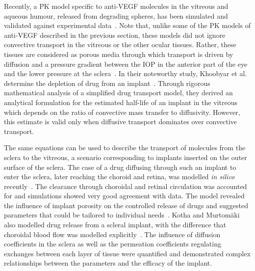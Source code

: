 \documentclass{article}
\begin{document}
Recently, a PK model specific to anti-VEGF molecules in the vitreous and aqueous humour, released from degrading spheres, has been simulated and validated against experimental data~\cite{Heljak_2022}.
Note that, unlike some of the PK models of anti-VEGF described in the previous section, these models did not ignore convective transport in the vitreous or the other ocular tissues.
Rather, these tissues are considered as porous media through which transport is driven by diffusion and a pressure gradient between the IOP in the anterior part of the eye and the lower pressure at the sclera~\cite{Ferreira_2020,Ferreira_2018,Heljak_2022,Khoobyar_2021,Li_2022a}.
In their noteworthy study, Khoobyar et al. determine the depletion of drug from an implant~\cite{Khoobyar_2022}.
Through rigorous mathematical analysis of a simplified drug transport model, they derived an analytical formulation for the estimated half-life of an implant in the vitreous which depends on the ratio of convective mass transfer to diffusivity.
However, this estimate is valid only when diffusive transport dominates over convective transport.



The same equations can be used to describe the transport of molecules from the sclera to the vitreous, a scenario corresponding to implants inserted on the outer surface of the sclera.
The case of a drug diffusing through such an implant to enter the sclera, later reaching the choroid and retina, was modelled \textit{in silico} recently~\cite{Abootorabi_2021}.
The clearance through choroidal and retinal circulation was accounted for and simulations showed very good agreement with data.
The model revealed the influence of implant porosity on the controlled release of drugs and suggested parameters that could be tailored to individual needs~\cite{Abootorabi_2021}.
Kotha and Murtom\"aki also modelled drug release from a scleral implant, with the difference that choroidal blood flow was modelled explicitly~\cite{Kotha_2014}.
The influence of diffusion coefficients in the sclera as well as the permeation coefficients regulating exchanges between each layer of tissue were quantified and demonstrated complex relationships between the parameters and the efficacy of the implant.
\end{document}
